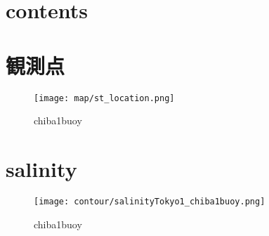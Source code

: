 \documentclass[12pt,a4paper]{jarticle}
\begin{document}
\section{contents}



\section{観測点}
\begin{figure}[hbtp]
  \texttt{[image: map/st\_location.png]}
  \caption{chiba1buoy}
  \label{地図}
\end{figure}

\section{salinity}
\begin{figure}[hbtp]
    \texttt{[image: contour/salinityTokyo1\_chiba1buoy.png]}
    \caption{chiba1buoy}
\end{figure}
\end{document}

